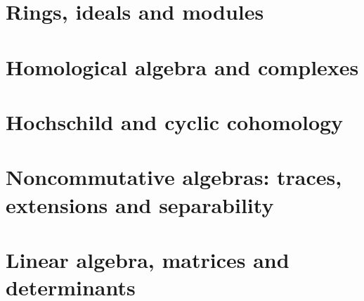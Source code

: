 \documentclass[11pt]{article}
\theoremstyle{plain}
\theoremstyle{definition}
\theoremstyle{remark}
\renewcommand{\_}{\bkunderscore\allowbreak}
\begin{document}
\part{Rings, ideals and modules}










\part{Homological algebra and complexes}







\part{Hochschild and cyclic cohomology}












\part{Noncommutative algebras: traces, extensions and separability}









\part{Linear algebra, matrices and determinants}









\end{document}
